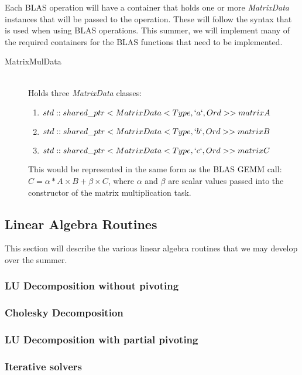 \documentclass[]{article}
\begin{document}
Each BLAS operation will have a container that holds one or more \emph{MatrixData} instances that will be passed to the operation. These will follow the syntax that is used when using BLAS operations. This summer, we will implement many of the required containers for the BLAS functions that need to be implemented.

\begin{description}
	\item[MatrixMulData] \hfill \\
	Holds three \emph{MatrixData} classes:
	\begin{enumerate}
		\item $std::shared\_ptr<MatrixData<Type, `a`, Ord>> matrixA$
		\item $std::shared\_ptr<MatrixData<Type, `b`, Ord>> matrixB$
		\item $std::shared\_ptr<MatrixData<Type, `c`, Ord>> matrixC$
	\end{enumerate}

	This would be represented in the same form as the BLAS GEMM call: $C = \alpha*A \times B + \beta \times C$, where $\alpha$ and $\beta$ are scalar values passed into the constructor of the matrix multiplication task.

\end{description}



\subsection{Linear Algebra Routines}

This section will describe the various linear algebra routines that we may develop over the summer.

\subsubsection{LU Decomposition without pivoting}

\subsubsection{Cholesky Decomposition}

\subsubsection{LU Decomposition with partial pivoting}

\subsubsection{Iterative solvers}
\end{document}
